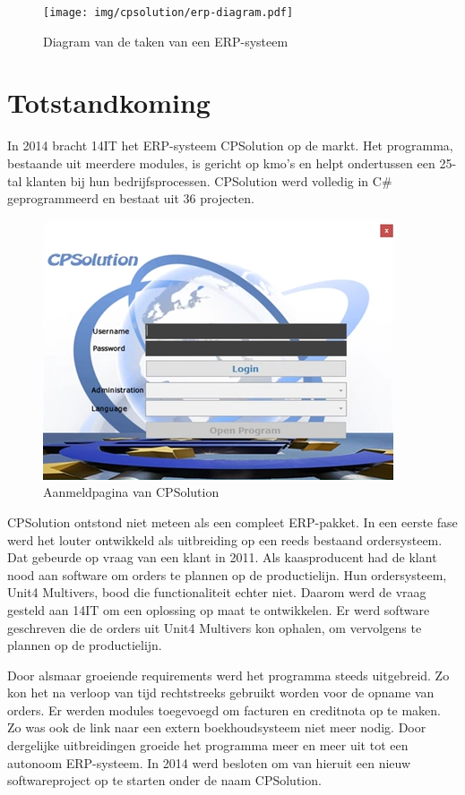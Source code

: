 \begin{figure}[H]
	\centering
	\texttt{[image: img/cpsolution/erp-diagram.pdf]}
	\caption{\label{fig:erp-diagram}Diagram van de taken van een ERP-systeem}
\end{figure}

\pagebreak

\section{Totstandkoming}
\label{sec:totstandkoming}
In 2014 bracht 14IT het ERP-systeem CPSolution op de markt. Het programma, bestaande uit meerdere modules, is gericht op kmo's en helpt ondertussen een 25-tal klanten bij hun bedrijfsprocessen. CPSolution werd volledig in C\# geprogrammeerd en bestaat uit 36 projecten.

\begin{figure}[H]
	\centering
	\includegraphics[width=0.6\linewidth]{img/cpsolution/cpsolution.png}
	\caption{\label{fig:cpsolution}Aanmeldpagina van CPSolution}
\end{figure}

CPSolution ontstond niet meteen als een compleet ERP-pakket. In een eerste fase werd het louter ontwikkeld als uitbreiding op een reeds bestaand ordersysteem. Dat gebeurde op vraag van een klant in 2011. Als kaasproducent had de klant nood aan software om orders te plannen op de productielijn. Hun ordersysteem, Unit4 Multivers, bood die \mbox{functionaliteit} echter niet. Daarom werd de vraag gesteld aan 14IT om een oplossing op maat te ontwikkelen. Er werd software geschreven die de orders uit Unit4 Multivers kon ophalen, om vervolgens te plannen op de productielijn. 

Door alsmaar groeiende requirements werd het programma steeds uitgebreid. Zo kon het na verloop van tijd rechtstreeks gebruikt worden voor de opname van orders. Er werden modules toegevoegd om facturen en creditnota op te maken. Zo was ook de link naar een extern boekhoudsysteem niet meer nodig. Door dergelijke uitbreidingen groeide het programma meer en meer uit tot een autonoom ERP-systeem. In 2014 werd besloten om van hieruit een nieuw softwareproject op te starten onder de naam CPSolution.

